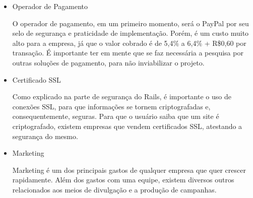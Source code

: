 \begin{itemize}
\begin{itemize}
\item Operador de Pagamento

O operador de pagamento, em um primeiro momento, será o PayPal por seu selo de segurança e praticidade de implementação. Porém, é um custo muito alto para a empresa, já que o valor cobrado é de 5,4\% a 6,4\% + R\$0,60 por transação. É importante ter em mente que se faz necessária a pesquisa por outras soluções de pagamento, para não inviabilizar o projeto.

\item Certificado SSL

Como explicado na parte de segurança do Rails, é importante o uso de conexões SSL, para que informações se tornem criptografadas e, consequentemente, seguras. Para que o usuário saiba que um site é criptografado, existem empresas que vendem certificados SSL, atestando a segurança do mesmo.

\item Marketing

Marketing é um dos principais gastos de qualquer empresa que quer crescer rapidamente. Além dos gastos com uma equipe, existem diversos outros relacionados aos meios de divulgação e a produção de campanhas.

\end{itemize}

\end{itemize}
